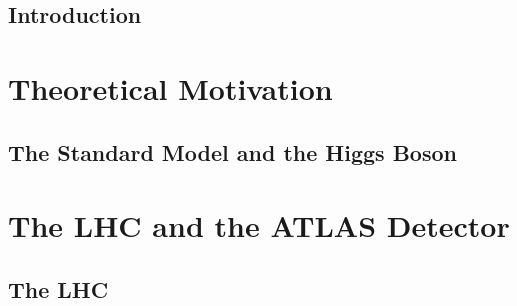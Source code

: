 \documentclass[12pt]{report}	%
\theoremstyle{definition}
\theoremstyle{remark}
\begin{document}
\doublespacing
\section{Introduction}
\label{sec:intro}


\chapter{Theoretical Motivation}
\label{part:theory}
% 

\section{The Standard Model and the Higgs Boson}
\label{sec:sm}

% 

%



\chapter{The LHC and the ATLAS Detector}
\label{part:lhcAtlas}


\section{The LHC}
\label{sec:lhc}

\end{document}
